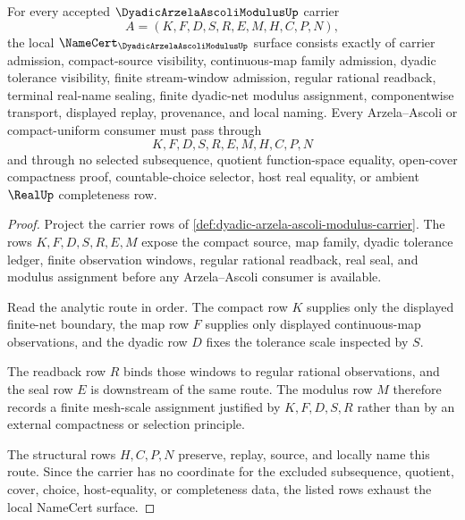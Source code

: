 \begin{theorem}
\label{thm:dyadic-arzela-ascoli-modulus-namecert-obligations}
For every accepted $\DyadicArzelaAscoliModulusUp$ carrier
$$
A=(K,F,D,S,R,E,M,H,C,P,N),
$$
the local $\NameCert_{\DyadicArzelaAscoliModulusUp}$ surface consists exactly of carrier admission, compact-source visibility, continuous-map family admission, dyadic tolerance visibility, finite stream-window admission, regular rational readback, terminal real-name sealing, finite dyadic-net modulus assignment, componentwise transport, displayed replay, provenance, and local naming. Every Arzela--Ascoli or compact-uniform consumer must pass through
$$
K,F,D,S,R,E,M,H,C,P,N
$$
and through no selected subsequence, quotient function-space equality, open-cover compactness proof, countable-choice selector, host real equality, or ambient $\RealUp$ completeness row.
\end{theorem}
\begin{proof}
Project the carrier rows of \autoref{def:dyadic-arzela-ascoli-modulus-carrier}. The rows $K,F,D,S,R,E,M$ expose the compact source, map family, dyadic tolerance ledger, finite observation windows, regular rational readback, real seal, and modulus assignment before any Arzela--Ascoli consumer is available.

Read the analytic route in order. The compact row $K$ supplies only the displayed finite-net boundary, the map row $F$ supplies only displayed continuous-map observations, and the dyadic row $D$ fixes the tolerance scale inspected by $S$.

The readback row $R$ binds those windows to regular rational observations, and the seal row $E$ is downstream of the same route. The modulus row $M$ therefore records a finite mesh-scale assignment justified by $K,F,D,S,R$ rather than by an external compactness or selection principle.

The structural rows $H,C,P,N$ preserve, replay, source, and locally name this route. Since the carrier has no coordinate for the excluded subsequence, quotient, cover, choice, host-equality, or completeness data, the listed rows exhaust the local NameCert surface.
\end{proof}

